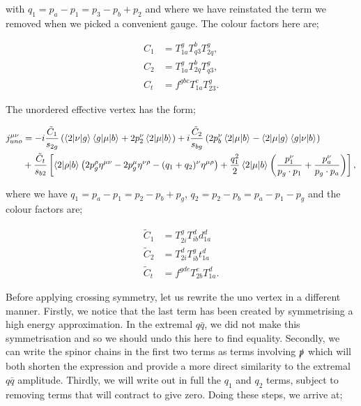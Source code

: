 with $q_1 = p_a - p_1 = p_3 - p_b + p_2$ and where we have reinstated the term we removed when we picked a convenient gauge. The colour factors here are;

\begin{equation}
\begin{split}
C_1 &= T^g_{1a} T^b_{q3}T^g_{2q}, \\
C_2 &= T^g_{1a} T^b_{2q}T^g_{q3}, \\
C_t &= f^{gbc}T^c_{1a}T^g_{23}.
\end{split}
\end{equation}

The unordered effective vertex has the form;

\begin{equation}
\begin{split}
j_{uno}^{\mu \nu} &= -i \frac{\tilde{C}_1}{s_{2g}} \left(\mathinner{\langle2\vert\nu\vert g\rangle}_{}\mathinner{\langle g\vert\mu\vert b\rangle}_{} + 2p_2^\nu \mathinner{\langle2\vert\mu\vert b\rangle}_{} \right) + i \frac{\tilde{C}_2}{s_{bg}} \left(2p_b^\nu \mathinner{\langle2\vert\mu\vert b\rangle}_{} - \mathinner{\langle2\vert\mu\vert g\rangle}_{} \mathinner{\langle g\vert\nu\vert b\rangle}_{} \right) \\
&+ \frac{\tilde{C}_t}{s_{b2}} \left[\mathinner{\langle2\vert\rho\vert b\rangle}_{} \left(2p_g^\rho \eta^{\mu \nu} - 2 p_g^\mu \eta^{\nu \rho} - (q_1 + q_2)^\nu \eta^{\mu \rho} \right) + \frac{q_1^2}{2} \mathinner{\langle2\vert\mu\vert b\rangle}_{} \left(\frac{p_1^\nu}{p_g \cdot p_1} + \frac{p_a^\nu}{p_g \cdot p_a} \right) \right],
\end{split}
\end{equation}

where we have $q_1 = p_a - p_1 = p_2 - p_b + p_g$, $q_2 = p_2 - p_b = p_a - p_1 - p_g$ and the colour factors are;

\begin{equation}
\begin{split}
\tilde{C}_1 &= T_{2i}^g T_{ib}^d d^d_{1a} \\
\tilde{C}_2 &= T^d_{2i} T_{ib}^g t_{1a}^d \\
\tilde{C}_t &= f^{gde}T^e_{2b}T^d_{1a}.
\end{split}
\end{equation}

Before applying crossing symmetry, let us rewrite the uno vertex in a different manner. Firstly, we notice that the last term has been created by symmetrising a high energy approximation. In the extremal $q\bar{q}$, we did not make this symmetrisation  and so we should undo this here to find equality. Secondly, we can write the spinor chains in the first two terms as terms involving $\slashed{p}$ which will both shorten the expression and provide a more direct similarity to the extremal $q\bar{q}$ amplitude. Thirdly, we will write out in full the $q_1$ and $q_2$ terms, subject to removing terms that will contract to give zero. Doing these steps, we arrive at;

